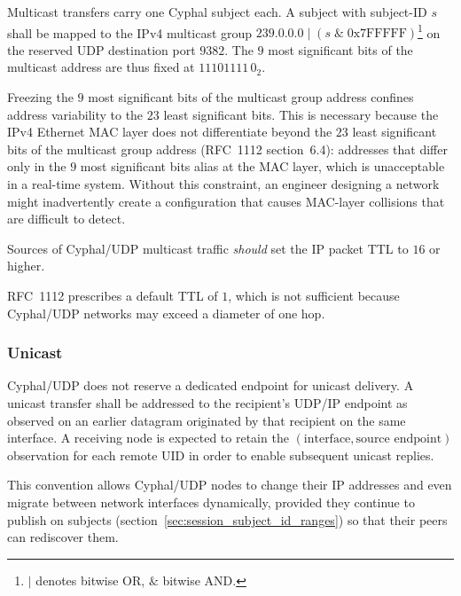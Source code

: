 Multicast transfers carry one Cyphal subject each.
A subject with subject-ID $s$ shall be mapped to the IPv4 multicast group
$239.0.0.0 \;|\; (s \;\&\; \text{0x7FFFFF})$\footnote{%
    $|$ denotes bitwise OR, $\&$ bitwise AND.
} on the reserved UDP destination port $9382$.
The $9$ most significant bits of the multicast address are thus fixed at $11101111\,0_2$.

\begin{remark}
    Freezing the $9$ most significant bits of the multicast group address confines address variability to
    the $23$ least significant bits. This is necessary because the IPv4 Ethernet MAC layer does not
    differentiate beyond the $23$ least significant bits of the multicast group address
    (RFC~1112 section~6.4): addresses that differ only in the $9$ most significant bits alias at the MAC
    layer, which is unacceptable in a real-time system.
    Without this constraint, an engineer designing a network might inadvertently create a configuration
    that causes MAC-layer collisions that are difficult to detect.
\end{remark}

Sources of Cyphal/UDP multicast traffic \emph{should} set the IP packet TTL to $16$ or higher.

\begin{remark}
    RFC~1112 prescribes a default TTL of $1$, which is not sufficient because Cyphal/UDP networks may
    exceed a diameter of one hop.
\end{remark}

\subsubsection{Unicast}

Cyphal/UDP does not reserve a dedicated endpoint for unicast delivery.
A unicast transfer shall be addressed to the recipient's UDP/IP endpoint as observed on an earlier
datagram originated by that recipient on the same interface.
A receiving node is expected to retain the $(\text{interface}, \text{source endpoint})$ observation for
each remote UID in order to enable subsequent unicast replies.

\begin{remark}
    This convention allows Cyphal/UDP nodes to change their IP addresses and even migrate between
    network interfaces dynamically, provided they continue to publish on subjects
    (section~\ref{sec:session_subject_id_ranges}) so that their peers can rediscover them.
\end{remark}

